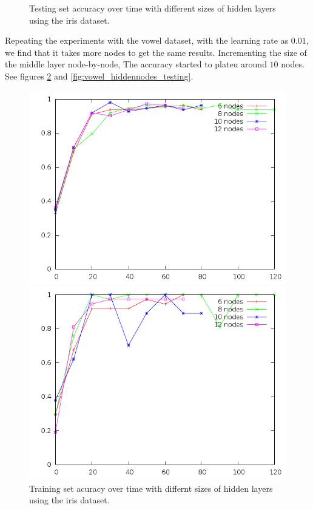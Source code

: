 \documentclass[12pt]{article}
\begin{document}
\begin{figure}[!ht]
\begin{minipage}[b]{0.45\linewidth}
        \caption{Testing set accuracy over time with different sizes of hidden layers using the iris dataset.}
        \label{fig:iris_hiddennodes_testing}
    \end{minipage}
\end{figure}

Repeating the experiments with the vowel dataset, with the learning rate as
$0.01$, we find that it takes more nodes to get the same results. Incrementing
the size of the middle layer node-by-node, The accuracy started to plateu
around $10$ nodes. See figures \ref{fig:vowel_hiddennodes_training} and \ref{fig:vowel_hiddennodes_testing}.

\begin{figure}[!ht]
    \centering
    \begin{minipage}[b]{0.45\linewidth}
        \includegraphics[width=1.0\textwidth]{vowel-hiddennodes-training}
        \caption{Training set acuracy over time with differnt sizes of hidden layers using the iris dataset.}
        \label{fig:vowel_hiddennodes_training}
    \end{minipage}
    \quad
    \begin{minipage}[b]{0.45\linewidth}
        \includegraphics[width=1.0\textwidth]{vowel-hiddennodes-testing}

\end{minipage}
\end{figure}
\end{document}
